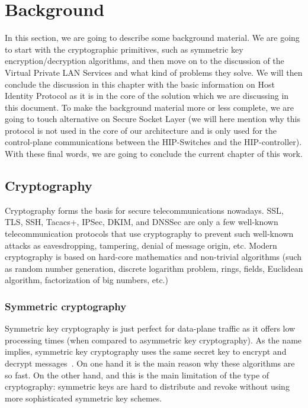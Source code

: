 \chapter{Background}

In this section, we are going to describe some background material. 
We are going to start with the cryptographic primitives, such as 
symmetric key encryption/decryption algorithms, and then move on 
to the discussion of the Virtual Private LAN Services and what kind 
of problems they solve. We will then conclude the discussion in this 
chapter with the basic information on Host Identity Protocol as it 
is in the core of the solution which we are discussing in this 
document. To make the background material more or less complete, 
we are going to touch alternative on Secure Socket Layer (we 
will here mention why this protocol is not used in the core of our 
architecture and is only used for the control-plane communications 
between the HIP-Switches and the HIP-controller). With these final 
words, we are going to conclude the current chapter of this work. 

\section{Cryptography}
Cryptography forms the basis for secure telecommunications nowadays. 
SSL, TLS, SSH, Tacacs+, IPSec, DKIM, and DNSSec are only a few well-known 
telecommunication protocols that use cryptography to prevent such well-known 
attacks as eavesdropping, tampering, denial of message origin, etc. Modern 
cryptography is based on hard-core mathematics and non-trivial algorithms 
(such as random number generation, discrete logarithm problem, rings, fields, 
Euclidean algorithm, factorization of big numbers, etc.) 

\subsection{Symmetric cryptography}
Symmetric key cryptography is just perfect for data-plane traffic as it offers 
low processing times (when compared to asymmetric key cryptography). As the 
name implies, symmetric key cryptography uses the same secret key to encrypt 
and decrypt messages~\cite{Stinson:Cryptography}. On one hand it is the main reason why these algorithms 
are so fast. On the other hand, and this is the main limitation of the type 
of cryptography: symmetric keys are hard to distribute and revoke without using 
more sophisticated symmetric key schemes. 

